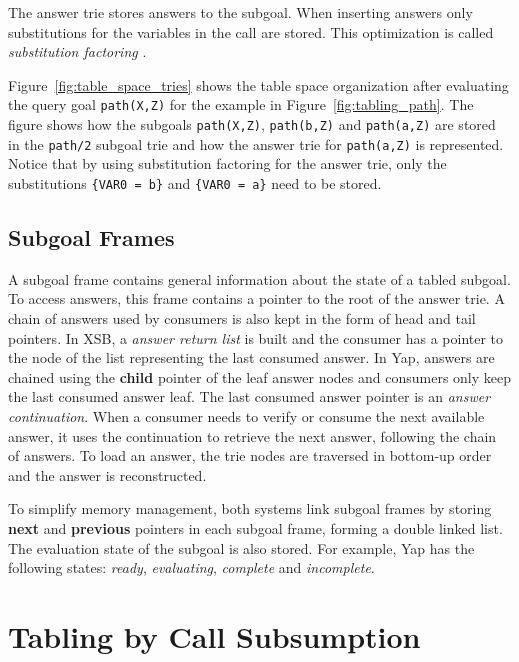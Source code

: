 The answer trie stores answers to the subgoal. When inserting answers only substitutions
for the variables in the call are stored. This optimization is called \textit{substitution factoring} \cite{RamakrishnanIV-95}.

Figure~\ref{fig:table_space_tries} shows the table space organization after evaluating the query goal
\texttt{path(X,Z)} for the example in Figure~\ref{fig:tabling_path}.
The figure shows how the subgoals \texttt{path(X,Z)}, \texttt{path(b,Z)} and \texttt{path(a,Z)} are
stored in the \texttt{path/2} subgoal trie and how the answer trie for \texttt{path(a,Z)} is represented.
Notice that by using substitution factoring for the answer trie, only the substitutions
\texttt{\{VAR0~=~b\}} and \texttt{\{VAR0~=~a\}} need to be stored.

\subsection{Subgoal Frames}

A subgoal frame contains general information about the state of a tabled subgoal. To access answers, this
frame contains a pointer to the root of the answer trie. A chain of answers used by consumers is also kept
in the form of head and tail pointers. In XSB, a \textit{answer return list} is built and the consumer has
a pointer to the node of the list representing the last consumed answer. In Yap, answers are chained using
the \textbf{child} pointer of the leaf answer nodes and consumers only keep the last consumed answer leaf.
The last consumed answer pointer is an \textit{answer continuation}. When a consumer needs to verify
or consume the next available answer, it uses the continuation to retrieve the next answer, following the
chain of answers. To load an answer, the trie nodes are traversed in bottom-up order and the answer is
reconstructed.

To simplify memory management, both systems link subgoal frames by storing
\textbf{next} and \textbf{previous} pointers in each subgoal frame, forming a double linked list.
The evaluation state of the subgoal is also stored. For example, Yap has the following states:
\textit{ready}, \textit{evaluating}, \textit{complete} and \textit{incomplete}.

\section{Tabling by Call Subsumption} \label{sec:subsumption}

